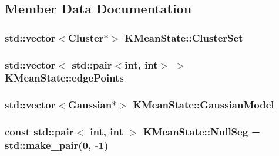 \subsection{Member Data Documentation}
\hypertarget{class_k_mean_state_af3d3973abdeb6f4659b46ec271be52d7}{
\subsubsection[{Cluster\+Set}]{\setlength{\rightskip}{0pt plus 5cm}std\+::vector$<${\bf Cluster}$\ast$$>$ K\+Mean\+State\+::\+Cluster\+Set\hspace{0.3cm}{\ttfamily [private]}}}\label{class_k_mean_state_af3d3973abdeb6f4659b46ec271be52d7}
\hypertarget{class_k_mean_state_a4cfe086303bf1f39b038e48126dd007d}{
\subsubsection[{edge\+Points}]{\setlength{\rightskip}{0pt plus 5cm}std\+::vector$<$ std\+::pair$<$int, int$>$ $>$ K\+Mean\+State\+::edge\+Points\hspace{0.3cm}{\ttfamily [private]}}}\label{class_k_mean_state_a4cfe086303bf1f39b038e48126dd007d}
\hypertarget{class_k_mean_state_ac74dea5743d248a6049fb8ef126054a9}{
\subsubsection[{Gaussian\+Model}]{\setlength{\rightskip}{0pt plus 5cm}std\+::vector$<${\bf Gaussian}$\ast$$>$ K\+Mean\+State\+::\+Gaussian\+Model\hspace{0.3cm}{\ttfamily [private]}}}\label{class_k_mean_state_ac74dea5743d248a6049fb8ef126054a9}
\hypertarget{class_k_mean_state_a56e790726e956e3a6eec8689a62faa21}{
\subsubsection[{Null\+Seg}]{\setlength{\rightskip}{0pt plus 5cm}const std\+::pair$<$ int, int $>$ K\+Mean\+State\+::\+Null\+Seg = std\+::make\+\_\+pair(0, -\/1)\hspace{0.3cm}{\ttfamily [static]}}}\label{class_k_mean_state_a56e790726e956e3a6eec8689a62faa21}
